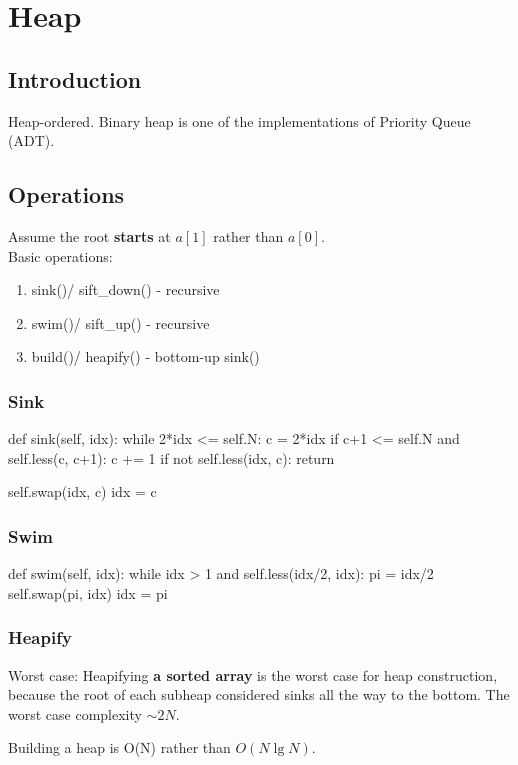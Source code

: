 \chapter{Heap}

\section{Introduction}
Heap-ordered. Binary heap is one of the implementations of Priority Queue (ADT). 

\section{Operations}
Assume the root \textbf{starts} at $a[1]$ rather than $a[0]$.
\\
Basic operations:
\begin{enumerate}
\item sink()/ sift\_down() - recursive
\item swim()/ sift\_up() - recursive
\item build()/ heapify() - bottom-up sink()
\end{enumerate}
\subsection{Sink}
\begin{python}
def sink(self, idx):
    while 2*idx <= self.N:
        c = 2*idx
        if c+1 <= self.N and self.less(c, c+1):
            c += 1
        if not self.less(idx, c):
            return 

        self.swap(idx, c)
        idx = c
\end{python}
\subsection{Swim}
\begin{python}
def swim(self, idx):
    while idx > 1 and self.less(idx/2, idx):
        pi = idx/2
        self.swap(pi, idx)
        idx = pi
\end{python}
\subsection{Heapify}
Worst case: Heapifying \textbf{a sorted array} is the worst case for heap construction, because the root of each subheap considered sinks all the way to the bottom. The worst case complexity $\sim 2N$.

Building a heap is O(N) rather than $O(N \lg N)$.

